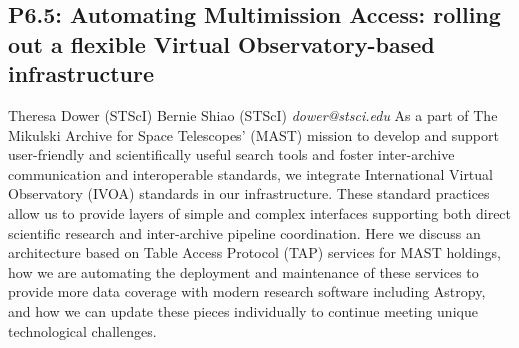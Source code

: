 \documentclass{report}
\begin{document}
\subsection*{P6.5: Automating Multimission Access: rolling out a flexible Virtual Observatory-based infrastructure}
\bigskip
Theresa Dower (STScI) \newline Bernie Shiao (STScI) \newline   \newline   \newline  \newline  \newline\newline
{\it dower@stsci.edu}\newline
\newline\newline
As a part of The Mikulski Archive for Space Telescopes' (MAST) mission to develop and support user-friendly and scientifically useful search tools and foster inter-archive communication and interoperable standards, we integrate International Virtual Observatory (IVOA) standards in our infrastructure. These standard practices allow us to provide layers of simple and complex interfaces supporting both direct scientific research and inter-archive pipeline coordination. Here we discuss an architecture based on Table Access Protocol (TAP) services for MAST holdings, how we are automating the deployment and maintenance of these services to provide more data coverage with modern research software including Astropy, and how we can update these pieces individually to continue meeting unique technological challenges.\newline
\newpage
\end{document}
